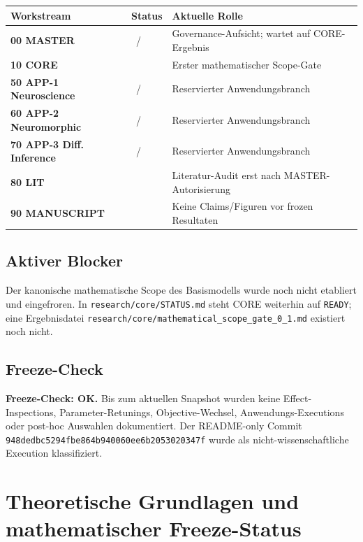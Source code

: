 \documentclass[11pt,a4paper]{article}
\newcommand{\status}[2]{\tcbox[on line,boxrule=0pt,arc=1.5pt,left=4pt,right=4pt,top=2pt,bottom=2pt,colback=#2!12,coltext=#2,fontupper=\bfseries\footnotesize]{#1}}
\newcommand{\WAIT}{\status{WAIT}{graydark}}
\newcommand{\PROTECTED}{\status{PROTECTED}{purple}}
\newcommand{\FROZEN}{\status{FROZEN}{blue}}
\begin{document}
\begin{tabularx}{\textwidth}{>{\bfseries}p{} p{} X}
\toprule
Workstream & Status & Aktuelle Rolle \\
\midrule
00 MASTER & \FROZEN\ / \WAIT & Governance-Aufsicht; wartet auf CORE-Ergebnis \\
10 CORE & \status{READY}{green} & Erster mathematischer Scope-Gate \\
50 APP-1 Neuroscience & \PROTECTED\ / \WAIT & Reservierter Anwendungsbranch \\
60 APP-2 Neuromorphic & \PROTECTED\ / \WAIT & Reservierter Anwendungsbranch \\
70 APP-3 Diff. Inference & \PROTECTED\ / \WAIT & Reservierter Anwendungsbranch \\
80 LIT & \WAIT & Literatur-Audit erst nach MASTER-Autorisierung \\
90 MANUSCRIPT & \WAIT & Keine Claims/Figuren vor frozen Resultaten \\
\bottomrule
\end{tabularx}

\subsection{Aktiver Blocker}

Der kanonische mathematische Scope des Basismodells wurde noch nicht etabliert und eingefroren. In \texttt{research/core/STATUS.md} steht CORE weiterhin auf \texttt{READY}; eine Ergebnisdatei \texttt{research/core/mathematical\_scope\_gate\_0\_1.md} existiert noch nicht.

\subsection{Freeze-Check}

\begin{successbox}
\textbf{Freeze-Check: OK.} Bis zum aktuellen Snapshot wurden keine Effect-Inspections, Parameter-Retunings, Objective-Wechsel, Anwendungs-Executions oder post-hoc Auswahlen dokumentiert. Der README-only Commit \texttt{948dedbc5294fbe864b940060ee6b2053020347f} wurde als nicht-wissenschaftliche Execution klassifiziert.
\end{successbox}

\section{Theoretische Grundlagen und mathematischer Freeze-Status}
\end{document}
